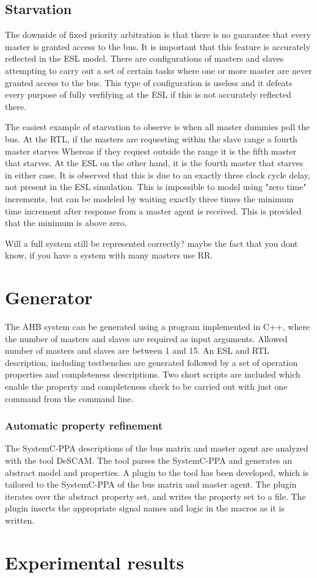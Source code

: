 \subsection{Starvation}
The downside of fixed priority arbitration is that there is no guarantee that every master is granted access to the bus. It is important that this feature is
accurately reflected in the ESL model. There are configurations of masters and slaves attempting to carry out a set of certain tasks where one or more master are never granted access to the bus. This type of configuration is useless and it defeats every purpose of fully verfifying at the ESL if this is not accurately reflected there. \par
The easiest example of starvation to observe is when all master dummies poll the bus. At the RTL, if the masters are requesting within the slave range a fourth master starves Whereas if they request outside the range it is the fifth master that starves. At the ESL on the other hand, it is the fourth master that starves
in either case. It is observed that this is due to an exactly three clock cycle delay, not present in the ESL simulation. This is impossible to model using "zero time" increments, but can be modeled by waiting exactly three times the minimum time increment after response from a master agent is received. This is provided that the minimum is above zero. \par
Will a full system still be represented correctly? maybe the fact that you dont know, if you have a system with many masters use RR.



\section{Generator}
\label{sec:generator}
The AHB system can be generated using a program implemented in C++, where the number of masters and slaves are required as input arguments. Allowed number of
masters and slaves are between 1 and 15. An ESL and RTL description, including testbenches are generated followed by a set of operation properties and completeness descriptions. Two short scripts are included which enable the property and completeness check to be carried out with just one command from the
command line. 

\subsubsection{Automatic property refinement}
The SystemC-PPA descriptions of the bus matrix and master agent are analyzed with the tool DeSCAM. The tool parses the SystemC-PPA and generates an abstract
model and properties. A plugin to the tool has been developed, which is tailored to the SystemC-PPA of the bus matrix and master agent. The plugin iterates 
over the abstract property set, and writes the property set to a file. The plugin inserts the appropriate signal names and logic in the macros as it is written.
 

\section{Experimental results}
\label{sec:results}



